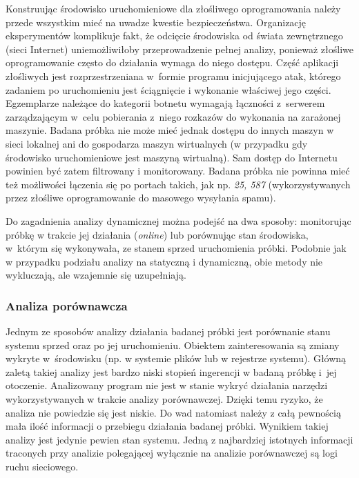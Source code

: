 \documentclass[a4paper,12pt,oneside]{article}
\begin{document}
	Konstruując środowisko uruchomieniowe dla złośliwego oprogramowania należy przede wszystkim mieć na uwadze kwestie bezpieczeństwa. Organizację eksperymentów komplikuje fakt, że odcięcie środowiska od świata zewnętrznego (sieci Internet) uniemożliwiłoby przeprowadzenie pełnej analizy, ponieważ złośliwe oprogramowanie często do działania wymaga do niego dostępu. Część aplikacji złośliwych jest rozprzestrzeniana w~formie programu inicjującego atak, którego zadaniem po uruchomieniu jest ściągnięcie i wykonanie właściwej jego części. Egzemplarze należące do kategorii botnetu wymagają łączności z~serwerem zarządzającym w~celu pobierania z~niego rozkazów do wykonania na zarażonej maszynie. Badana próbka nie może mieć jednak dostępu do innych maszyn w sieci lokalnej ani do gospodarza maszyn wirtualnych (w przypadku gdy środowisko uruchomieniowe jest maszyną wirtualną). Sam dostęp do Internetu powinien być zatem filtrowany i monitorowany. Badana próbka nie powinna mieć też możliwości łączenia się po portach takich, jak np. \textit{25, 587} (wykorzystywanych przez złośliwe oprogramowanie do masowego wysyłania spamu).
			
	Do zagadnienia analizy dynamicznej można podejść na dwa sposoby: monitorując próbkę w trakcie jej działania (\textit{online}) lub porównując stan środowiska, w~którym się wykonywała, ze stanem sprzed uruchomienia próbki. Podobnie jak w przypadku podziału analizy na statyczną i dynamiczną, obie metody nie wykluczają, ale wzajemnie się uzupełniają.
	
	\subsubsection{Analiza porównawcza}	
	Jednym ze sposobów analizy działania badanej próbki jest porównanie stanu systemu sprzed oraz po jej uruchomieniu. Obiektem zainteresowania są zmiany wykryte w~środowisku (np. w systemie plików lub w rejestrze systemu). Główną zaletą takiej analizy jest bardzo niski stopień ingerencji w badaną próbkę i~jej otoczenie. Analizowany program nie jest w stanie wykryć działania narzędzi wykorzystywanych w trakcie analizy porównawczej. Dzięki temu ryzyko, że analiza nie powiedzie się jest niskie. Do wad natomiast należy z całą pewnością mała ilość informacji o przebiegu działania badanej próbki. Wynikiem takiej analizy jest jedynie pewien stan systemu. Jedną z najbardziej istotnych informacji traconych przy analizie polegającej wyłącznie na analizie porównawczej są logi ruchu sieciowego.
	
\end{document}

